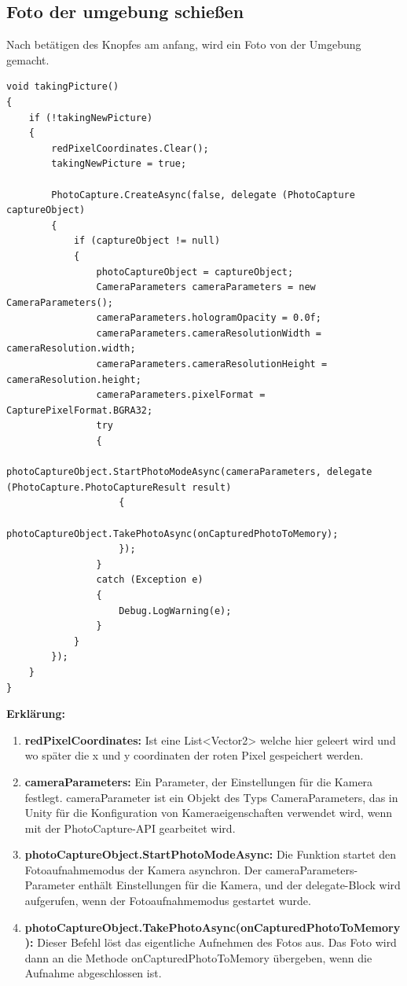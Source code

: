\subsection*{Foto der umgebung schießen}
Nach betätigen des Knopfes am anfang, wird ein Foto von der Umgebung gemacht.
\begin{lstlisting}[style=csharp, caption={}, label=code:takingPicture]
void takingPicture()
{
    if (!takingNewPicture)
    {
        redPixelCoordinates.Clear();
        takingNewPicture = true;

        PhotoCapture.CreateAsync(false, delegate (PhotoCapture captureObject)
        {
            if (captureObject != null)
            {
                photoCaptureObject = captureObject;
                CameraParameters cameraParameters = new CameraParameters();
                cameraParameters.hologramOpacity = 0.0f;
                cameraParameters.cameraResolutionWidth = cameraResolution.width;
                cameraParameters.cameraResolutionHeight = cameraResolution.height;
                cameraParameters.pixelFormat = CapturePixelFormat.BGRA32;
                try
                {
                    photoCaptureObject.StartPhotoModeAsync(cameraParameters, delegate (PhotoCapture.PhotoCaptureResult result)
                    {
                        photoCaptureObject.TakePhotoAsync(onCapturedPhotoToMemory);
                    });
                }
                catch (Exception e)
                {
                    Debug.LogWarning(e);
                }
            }
        });
    }
}
\end{lstlisting}
\textbf{Erklärung:}
\begin{enumerate}
    \item \textbf{redPixelCoordinates:} Ist eine List<Vector2> welche hier geleert wird und wo später die x und y coordinaten der roten Pixel gespeichert werden.
    \item \textbf{cameraParameters:} Ein Parameter, der Einstellungen für die Kamera festlegt. cameraParameter ist ein Objekt des Typs CameraParameters, das in Unity für die Konfiguration von Kameraeigenschaften verwendet wird, wenn mit der PhotoCapture-API gearbeitet wird.
    \item \textbf{photoCaptureObject.StartPhotoModeAsync:} Die Funktion startet den Fotoaufnahmemodus der Kamera asynchron. Der cameraParameters-Parameter enthält Einstellungen für die Kamera, und der delegate-Block wird aufgerufen, wenn der Fotoaufnahmemodus gestartet wurde.
    \item \textbf{photoCaptureObject.TakePhotoAsync(onCapturedPhotoToMemory):} Dieser Befehl löst das eigentliche Aufnehmen des Fotos aus. Das Foto wird dann an die Methode onCapturedPhotoToMemory übergeben, wenn die Aufnahme abgeschlossen ist.\\
\end{enumerate}


